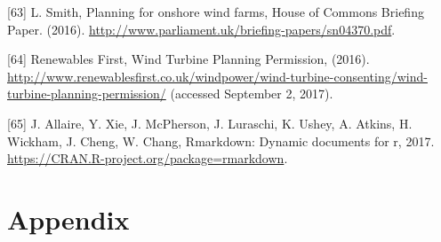 \documentclass[a4paper,]{article}
\theoremstyle{definition}
\theoremstyle{definition}
\theoremstyle{definition}
\theoremstyle{remark}
\begin{document}
\hypertarget{ref-Smith2016}{}
{[}63{]} L. Smith, Planning for onshore wind farms, House of Commons
Briefing Paper. (2016).
\url{http://www.parliament.uk/briefing-papers/sn04370.pdf}.

\hypertarget{ref-RF2016}{}
{[}64{]} Renewables First, Wind Turbine Planning Permission, (2016).
\url{http://www.renewablesfirst.co.uk/windpower/wind-turbine-consenting/wind-turbine-planning-permission/}
(accessed September 2, 2017).

\hypertarget{ref-R-rmarkdown}{}
{[}65{]} J. Allaire, Y. Xie, J. McPherson, J. Luraschi, K. Ushey, A.
Atkins, H. Wickham, J. Cheng, W. Chang, Rmarkdown: Dynamic documents for
r, 2017. \url{https://CRAN.R-project.org/package=rmarkdown}.

\newpage

\section*{Appendix}\label{appendix}
\end{document}
